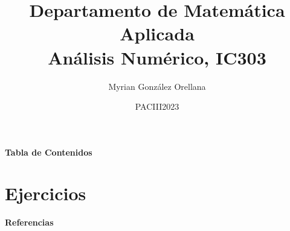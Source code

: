 \documentclass[10pt,legalpaper]{beamer}
\author{Myrian González Orellana}
\title{Departamento de Matemática Aplicada\\
Análisis Numérico, IC303}
\institute{UNAH}
\date{PACIII2023}
\begin{document}
\begin{frame}
\titlepage
\end{frame}
\begin{frame}{\centering\textbf{Tabla de Contenidos}}
\tableofcontents[hideallsubsections]
\end{frame}
%

\section{Ejercicios}

\begin{frame}{\textbf{Referencias}}
\printbibliography
\end{frame}
\end{document}
